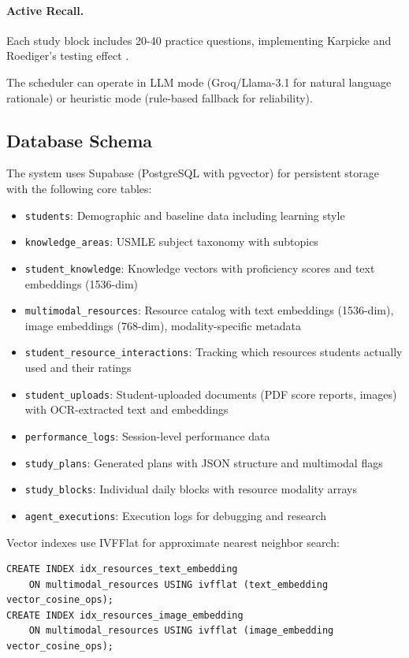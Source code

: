 \paragraph{Active Recall.}
Each study block includes 20-40 practice questions, implementing Karpicke and Roediger's testing effect \cite{karpicke2008retrieval}.

The scheduler can operate in LLM mode (Groq/Llama-3.1 for natural language rationale) or heuristic mode (rule-based fallback for reliability).

\subsection{Database Schema}

The system uses Supabase (PostgreSQL with pgvector) for persistent storage with the following core tables:

\begin{itemize}
    \item \texttt{students}: Demographic and baseline data including learning style
    \item \texttt{knowledge\_areas}: USMLE subject taxonomy with subtopics
    \item \texttt{student\_knowledge}: Knowledge vectors with proficiency scores and text embeddings (1536-dim)
    \item \texttt{multimodal\_resources}: Resource catalog with text embeddings (1536-dim), image embeddings (768-dim), modality-specific metadata
    \item \texttt{student\_resource\_interactions}: Tracking which resources students actually used and their ratings
    \item \texttt{student\_uploads}: Student-uploaded documents (PDF score reports, images) with OCR-extracted text and embeddings
    \item \texttt{performance\_logs}: Session-level performance data
    \item \texttt{study\_plans}: Generated plans with JSON structure and multimodal flags
    \item \texttt{study\_blocks}: Individual daily blocks with resource modality arrays
    \item \texttt{agent\_executions}: Execution logs for debugging and research
\end{itemize}

Vector indexes use IVFFlat for approximate nearest neighbor search:
\begin{verbatim}
CREATE INDEX idx_resources_text_embedding 
    ON multimodal_resources USING ivfflat (text_embedding vector_cosine_ops);
CREATE INDEX idx_resources_image_embedding 
    ON multimodal_resources USING ivfflat (image_embedding vector_cosine_ops);
\end{verbatim}

